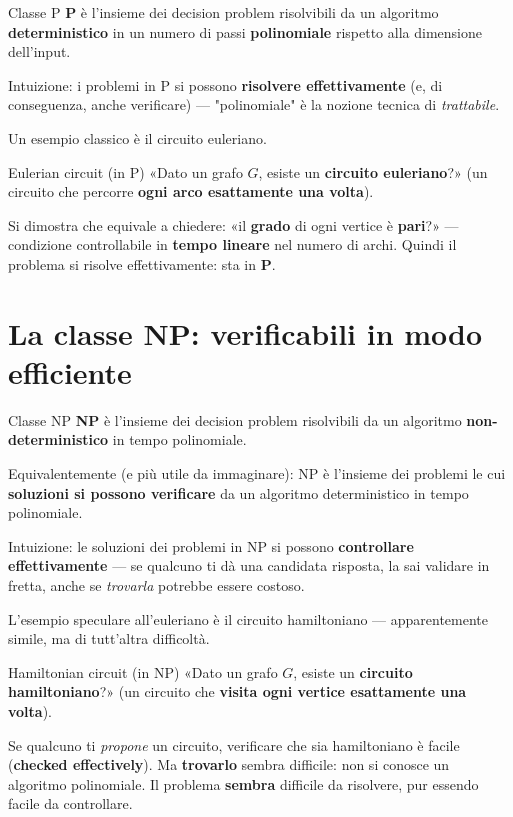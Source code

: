 \begin{boxdefinition}{Classe P}
\textbf{P} è l'insieme dei decision problem risolvibili da un algoritmo \textbf{deterministico} in un numero di passi \textbf{polinomiale} rispetto alla dimensione dell'input.

Intuizione: i problemi in P si possono \textbf{risolvere effettivamente} (e, di conseguenza, anche verificare) — "polinomiale" è la nozione tecnica di \emph{trattabile}.
\end{boxdefinition}

Un esempio classico è il circuito euleriano.

\begin{boxexample}{Eulerian circuit (in P)}
«Dato un grafo $G$, esiste un \textbf{circuito euleriano}?» (un circuito che percorre \textbf{ogni arco esattamente una volta}).

Si dimostra che equivale a chiedere: «il \textbf{grado} di ogni vertice è \textbf{pari}?» — condizione controllabile in \textbf{tempo lineare} nel numero di archi. Quindi il problema si risolve effettivamente: sta in \textbf{P}.
\end{boxexample}

\section{\texorpdfstring{La classe NP: verificabili in modo efficiente}{La classe NP: verificabili in modo efficiente}}

\begin{boxdefinition}{Classe NP}
\textbf{NP} è l'insieme dei decision problem risolvibili da un algoritmo \textbf{non-deterministico} in tempo polinomiale.

Equivalentemente (e più utile da immaginare): NP è l'insieme dei problemi le cui \textbf{soluzioni si possono verificare} da un algoritmo deterministico in tempo polinomiale.

Intuizione: le soluzioni dei problemi in NP si possono \textbf{controllare effettivamente} — se qualcuno ti dà una candidata risposta, la sai validare in fretta, anche se \emph{trovarla} potrebbe essere costoso.
\end{boxdefinition}

L'esempio speculare all'euleriano è il circuito hamiltoniano — apparentemente simile, ma di tutt'altra difficoltà.

\begin{boxexample}{Hamiltonian circuit (in NP)}
«Dato un grafo $G$, esiste un \textbf{circuito hamiltoniano}?» (un circuito che \textbf{visita ogni vertice esattamente una volta}).

Se qualcuno ti \emph{propone} un circuito, verificare che sia hamiltoniano è facile (\textbf{checked effectively}). Ma \textbf{trovarlo} sembra difficile: non si conosce un algoritmo polinomiale. Il problema \textbf{sembra} difficile da risolvere, pur essendo facile da controllare.
\end{boxexample}

